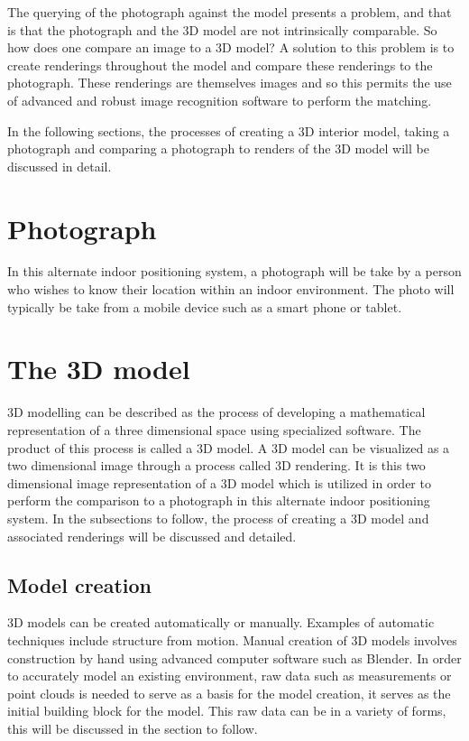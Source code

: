 \documentclass[11pt,a4paper]{report}
\begin{document}
	The querying of the photograph against the model presents a problem, and that is that the photograph and the 3D model are not intrinsically comparable. So how does one compare an image to a 3D model? A solution to this problem is to create renderings throughout the model and compare these renderings to the photograph. These renderings are themselves images and so this permits the use of advanced and robust image recognition software to perform the matching.
	
	In the following sections, the processes of creating a 3D interior model, taking a photograph and comparing a photograph to renders of the 3D model will be discussed in detail.
	
	\section{Photograph}
		In this alternate indoor positioning system, a photograph will be take by a person who wishes to know their location within an indoor environment. The photo will typically be take from a mobile device such as a smart phone or tablet.
	
	\newpage
	\section{The 3D model}
		3D modelling can be described as the process of developing a mathematical representation of a three dimensional space using specialized software. The product of this process is called a 3D model. A 3D model can be visualized as a two dimensional image through a process called 3D rendering. It is this two dimensional image representation of a 3D model which is utilized in order to perform the comparison to a photograph in this alternate indoor positioning system. In the subsections to follow, the process of creating a 3D model and associated renderings will be discussed and detailed.
		
		\subsection{Model creation}
			3D models can be created automatically or manually. Examples of automatic techniques include structure from motion. Manual creation of 3D models involves construction by hand using advanced computer software such as Blender. In order to accurately model an existing environment, raw data such as measurements or point clouds is needed to serve as a basis for the model creation, it serves as the initial building block for the model. This raw data can be in a variety of forms, this will be discussed in the section to follow.
		
\end{document}
